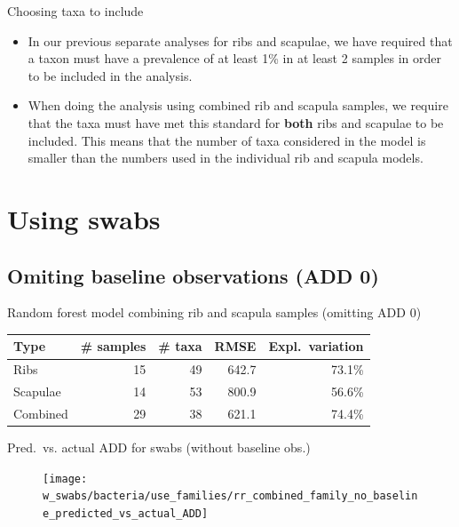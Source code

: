 \documentclass{beamer}
\begin{document}
\begin{frame}{Choosing taxa to include}
  
  \begin{itemize}
    \item In our previous separate analyses for ribs and scapulae, we have
    required that a taxon must have a prevalence of at least 1\%  in at least 2
    samples in order to be included in the analysis.
    \item When doing the analysis using combined rib and scapula samples, we
    require that the taxa must have met this standard for \textbf{both} ribs and
    scapulae to be included.  This means that the number of taxa considered in
    the model is smaller than the numbers used in the individual rib and scapula
    models.
  \end{itemize}

\end{frame}



\section{Using swabs}


\subsection{Omiting baseline observations (ADD 0)}

\begin{frame}{Random forest model combining rib and scapula samples (omitting ADD 0)}

  \begin{tabular}{lrrrr}
    Type & \# samples & \# taxa & RMSE & Expl.\ variation\\ \hline
    Ribs & 15 & 49 & 642.7 &      73.1\% \\
    Scapulae & 14 & 53 & 800.9 &  56.6\% \\
    Combined & 29 & 38 & 621.1 &  74.4\%
  \end{tabular}
  
  \vspace{0.1in}

\end{frame}


\begin{frame}{Pred.\ vs. actual ADD for swabs (without baseline obs.)}

  \begin{center}
    \begin{figure}
      \texttt{[image: w\_swabs/bacteria/use\_families/rr\_combined\_family\_no\_baseline\_predicted\_vs\_actual\_ADD]}
    \end{figure}
  \end{center}

\end{frame}
\end{document}
